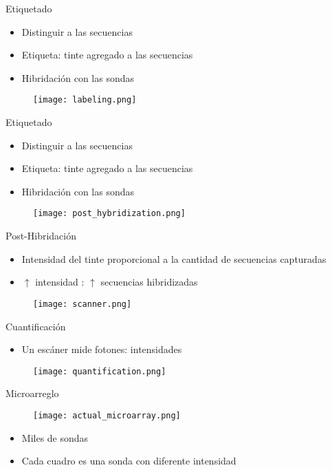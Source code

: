 \documentclass{beamer}
\begin{document}
\begin{frame}{Etiquetado}
\begin{itemize}
\item Distinguir a las secuencias
\item Etiqueta: tinte agregado a las secuencias
\item Hibridación con las sondas
\end{itemize}
\begin{figure}[H]
\centering
\texttt{[image: labeling.png]}
\end{figure}
\end{frame}

\begin{frame}{Etiquetado}
\begin{itemize}
\item Distinguir a las secuencias
\item Etiqueta: tinte agregado a las secuencias
\item Hibridación con las sondas
\end{itemize}
\begin{figure}[H]
\centering
\texttt{[image: post\_hybridization.png]}
\end{figure}
\end{frame}

\begin{frame}{Post-Hibridación}
\begin{itemize}
\item Intensidad del tinte proporcional a la cantidad de secuencias capturadas
\item $\uparrow$ intensidad : $\uparrow$ secuencias hibridizadas
\end{itemize}
\begin{figure}[H]
\centering
\texttt{[image: scanner.png]}
\end{figure}
\end{frame}

\begin{frame}{Cuantificación}
\begin{itemize}
\item Un escáner mide fotones: intensidades 
\end{itemize}
\begin{figure}[H]
\centering
\texttt{[image: quantification.png]}
\end{figure}
\end{frame}

\begin{frame}{Microarreglo}
\begin{figure}[H]
\centering
\texttt{[image: actual\_microarray.png]}
\end{figure}
\begin{itemize}
\item Miles de sondas
\item Cada cuadro es una sonda con diferente intensidad
\end{itemize}
\end{frame}
\end{document}
